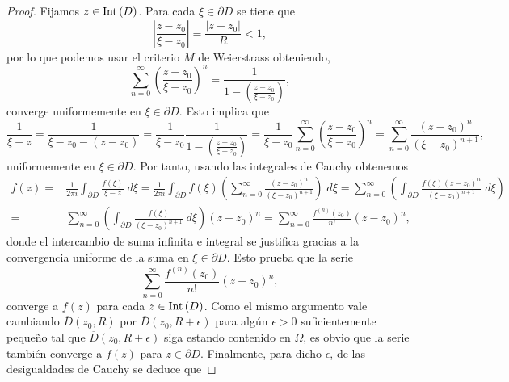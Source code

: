 \begin{proof}
Fijamos $\displaystyle z \in \operatorname{Int}\left(D\right) $. Para cada $\displaystyle \xi \in \partial D $ se tiene que 
\[ \left|\frac{z -z_{0}}{\xi -z_{0}}\right| = \frac{ \left|z-z_{0}\right|}{R} < 1 ,\]
por lo que podemos usar el criterio $\displaystyle M $ de Weierstrass obteniendo, 
\[\sum^{\infty}_{n = 0}\left(\frac{z-z_{0}}{\xi-z_{0}}\right)^{n}=\frac{1}{1-\left(\frac{z-z_{0}}{\xi-z_{0}}\right)} ,\]
converge uniformemente en $\displaystyle \xi \in \partial D $. Esto implica que 
\[\frac{1}{\xi -z}=\frac{1}{\xi-z_{0}-\left(z-z_{0}\right)} = \frac{1}{\xi-z_{0}}\frac{1}{1-\left(\frac{z-z_{0}}{\xi-z_{0}}\right)}=\frac{1}{\xi-z_{0}}\sum^{\infty}_{n = 0}\left(\frac{z-z_{0}}{\xi-z_{0}}\right)^{n}=\sum^{\infty }_{n=0}\frac{\left(z-z_{0}\right)^{n}}{\left(\xi-z_{0}\right)^{n+1}} ,\]
uniformemente en $\displaystyle \xi \in \partial D $. Por tanto, usando las integrales de Cauchy obtenemos 
\[
\begin{split}
	f\left(z\right)= & \frac{1}{2\pi i}\int _{\partial D}\frac{f\left(\xi\right)}{\xi-z} \; d\xi = \frac{1}{2\pi i}\int _{\partial D}f\left(\xi\right)\left(\sum^{\infty}_{n=0}\frac{\left(z-z_{0}\right)^{n}}{\left(\xi-z_{0}\right)^{n+1}}\right) \; d\xi 
	= \sum^{\infty}_{n=0}\left(\int _{\partial D}\frac{f\left(\xi\right)\left(z-z_{0}\right)^{n}}{\left(\xi-z_{0}\right)^{n+1}} \; d\xi\right) \\
	= & \sum^{\infty}_{n = 0}\left(\int _{\partial D}\frac{f\left(\xi\right)}{\left(\xi-z_{0}\right)^{n+1}} \; d\xi\right)\left(z-z_{0}\right)^{n}=\sum^{\infty}_{n=0}\frac{f^{\left(n\right)}\left(z_{0}\right)}{n!}\left(z-z_{0}\right)^{n},
\end{split}
\]
donde el intercambio de suma infinita e integral se justifica gracias a la convergencia uniforme de la suma en $\displaystyle \xi \in \partial D $. Esto prueba que la serie 
\[\sum^{\infty}_{n=0}\frac{f^{\left(n\right)}\left(z_{0}\right)}{n!}\left(z-z_{0}\right)^{n} ,\]
converge a $\displaystyle f\left(z\right) $ para cada $\displaystyle z \in \operatorname{Int}\left(D\right) $. Como el mismo argumento vale cambiando $\displaystyle \overline{D}\left(z_{0}, R\right) $ por $\displaystyle \overline{D}\left(z_{0}, R + \epsilon \right) $ para algún $\displaystyle \epsilon > 0 $ suficientemente pequeño tal que $\displaystyle \overline{D}\left(z_{0}, R + \epsilon \right) $ siga estando contenido en $\displaystyle \Omega  $, es obvio que la serie también converge a $\displaystyle f\left(z\right) $ para $\displaystyle z \in \partial D $. 
Finalmente, para dicho $\displaystyle \epsilon  $, de las desigualdades de Cauchy se deduce que 

\end{proof}
